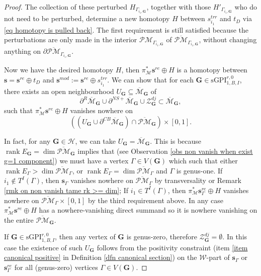 \documentclass[11pt]{amsart}
\theoremstyle{definition}
\theoremstyle{remark}
\newcommand{\oPMb}{{\overline{\mathcal{PM}}}}
\newcommand{\nontilde}{}
\newcommand{\<}{\left<}
\renewcommand{\>}{\right>}
\numberwithin{equation}{section}
\DeclareMathOperator{\rk}{rank}
\def\Mbar{{\overline{\mathcal M}}}
\def\sGPI{\text{sGPI}}
\begin{document}
\begin{proof}
        The collection of these perturbed $H_{\Gamma_{i_1,\bm{G}}}$, together with those $H'_{\Gamma_{i_1,\bm{G}}}$ who do not need to be perturbed, determine  a new homotopy $H$ between $\nontilde{s}^{trr}_{i_1}$ and $t_D$ via \eqref{eq homotopy is pulled back}. The first requirement is still satisfied because the perturbations are only made in the interior  $\mathcal{PM}_{\Gamma_{i_1,\bm{G}}}$ of $\oPMb_{\Gamma_{i_1,\bm{G}}}$, without changing anything on $\partial\oPMb_{\Gamma_{i_1,\bm{G}}}$.

        Now we have the desired homotopy $H$, then $\pi^*_{\mathcal M} \bm{s}^{re}\oplus H$ is a homotopy between $\bm{s}=\bm{s}^{re}\oplus t_D$ and $\bm{s}^{mod}:=\bm{s}^{re} \oplus \nontilde{s}^{trr}_{i_1}$. 
        We can show that for each $\bm{G}\in \sGPI^{r,0}_{1,B,I}$, there exists an open neighbourhood $U_{\bm{G}}\subseteq \Mbar_{\bm{G}}$ of 
     $$\partial^{R}\Mbar_{\bm{G}}\cup \partial^{NS+}\Mbar_{\bm{G}}\cup \mathcal Z^{dj}_{\bm{G}}\subset \Mbar_{\bm{G}},$$ 
     such that $\pi^*_{\mathcal M} \bm{s}^{re}\oplus H$ vanishes nowhere on 
     $$
     \left((U_{\bm{G}} \cup \partial^{CB}\Mbar_{\bm{G}})\cap \oPMb_{\bm{G}}\right)\times [0,1].
     $$
     
     In fact, for any $\bm{G}\in \bm{\mathcal H}$, we can take $U_{\bm{G}}=\Mbar_{\bm{G}}$. This is because $\rk E_{\bm{G}}=\dim \oPMb_{\bm{G}}$ implies that (see Observation \ref{obs non vanish when exist g=1 component}) we must have a vertex $\Gamma\in V(\bm{G})$ which such that either $\rk E_{\Gamma}>\dim \oPMb_{\Gamma}$, or $\rk E_{\Gamma}=\dim \oPMb_{\Gamma}$ and $\Gamma$ is genus-one. If $i_1 \notin T^I(\Gamma)$, then $\bm{s}_{\Gamma}$ vanishes nowhere on $\oPMb_{\Gamma}$ by transversality or Remark \ref{rmk on non vanish tame rk >= dim};  If $i_1 \in T^I(\Gamma)$, then $\pi^*_{\mathcal M}\bm{s}^{re}_{\Gamma}\oplus H$ vanishes nowhere on $\oPMb_{\Gamma}\times [0,1]$ by the third requirement above. In any case $\pi^*_{\mathcal M} \bm{s}^{re}\oplus H$ has a nowhere-vanishing direct summand so it is nowhere vanishing on the entire $\oPMb_{\bm{G}}$.

     If $\bm{G}\in \sGPI_{1,B,I}^{r,0}$, then any vertex of $\bm{G}$ is genus-zero, therefore $\mathcal Z^{dj}_{\bm{G}}=\emptyset$. In this case the existence of such $U_{\bm{G}}$ follows from the positivity constraint (item \ref{item canonical positive} in Definition \ref{dfn canonical section}) on the $\mathcal{W}$-part of $\bm{s}_{\Gamma}$ or $\bm{s}^{re}_{\Gamma}$ for all (genus-zero) vertices $\Gamma\in V(\bm{G})$.


\end{proof}
\end{document}

